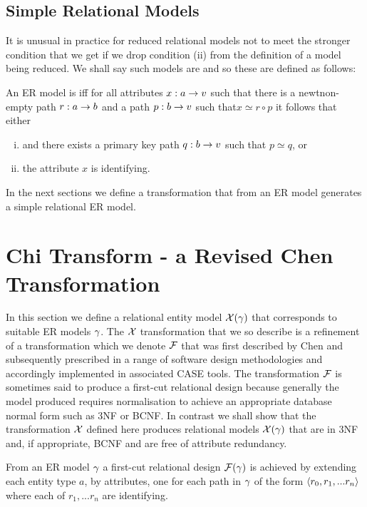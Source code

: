 \subsection{Simple Relational Models}
It is unusual in practice for reduced relational models not to meet the stronger condition that we get if we drop condition (ii) from the definition of a model being reduced. We shall say such models are  and so these are defined as follows:
\begin{definition} 
An  ER model is  iff for all attributes $x:a \rightarrow v$
such that there is a  newt{non-empty} path $r:a \rightarrow b$ and a  path $p:b \rightarrow v$ such that$x \simeq r \circ p$ it follows that 
either 
\begin{enumerate} [(i)]
\item {} and there exists a primary key path  $q:b \rightarrow v$ such that $p \simeq q$, or
\item the attribute $x$ is identifying.
\end{enumerate}
\end{definition}

In the next sections we define a transformation that from an ER model generates a simple relational ER model.

\section{Chi Transform - a Revised Chen Transformation}
In this section we define a relational  entity model $\mathcal{X}(\gamma)$ that corresponds
to suitable ER models $\gamma$. The $\mathcal{X}$ transformation that we so describe is a refinement
of a transformation which we denote $\mathcal{F}$ that was first described by Chen and subsequently prescribed in a range of software design methodologies and accordingly implemented in associated CASE tools. The transformation $\mathcal{F}$ is sometimes said to produce a first-cut relational design because generally the model produced requires normalisation
to achieve an appropriate database normal form such as 3NF or BCNF. 
In contrast we shall show that the transformation $\mathcal{X}$ defined here produces relational models $\mathcal{X}(\gamma)$ that are in 3NF and, if appropriate, BCNF and are free of attribute redundancy.

From an ER model $\gamma$ a first-cut relational design $\mathcal{F}(\gamma)$ is achieved by extending each
entity type $a$, by attributes,  one for each path in $\gamma$ of the 
form $\langle r_0,r_1,...r_n\rangle$ where each of $r_1,...r_n$ are identifying. 


